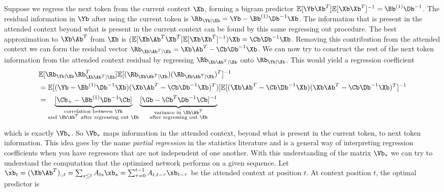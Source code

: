 \documentclass{article}
\begin{document}
Suppose we regress the next token from the current context $\Xb$, forming a bigram predictor $\mathbb{E}[\Yb\Xb^T]\mathbb{E}[\Xb\Xb^T]^{-1} = \Bb^{(1)}\Db^{-1}$. The residual information in $\Yb$ after using the current token is $\Rb_{\Yb|\Xb} = \Yb - \Bb^{(1)}\Db^{-1}\Xb$. The information that is present in the attended context beyond what is present in the current context can be found by this same regressing out procedure. The best approximation to $\Xb \Ab^T$ from $\Xb$ is $(\mathbb{E}[\Xb\Ab^T\Xb^T]\mathbb{E}[\Xb\Xb^T]^{-1})\Xb = \Cb \Db^{-1}\Xb$. Removing this contribution from the attended context we can form the residual vector $\Rb_{\Xb \Ab^T | \Xb} = \Xb\Ab^T - \Cb\Db^{-1}\Xb$. We can now try to construct the rest of the next token information from the attended context residual by regressing $\Rb_{\Xb \Ab^T | \Xb}$ onto $\Rb_{\Yb|\Xb}$. This would yield a regression coefficient 
\begin{align}
    &\mathbb{E}[\Rb_{\Yb|\Xb}\Rb_{\Xb \Ab^T | \Xb}^T]\mathbb{E}[(\Rb_{\Xb \Ab^T | \Xb})(\Rb_{\Xb \Ab^T | \Xb})^T]^{-1}\\
    &= \mathbb{E}[(\Yb - \Bb^{(1)}\Db^{-1}\Xb)(\Xb\Ab^T - \Cb\Db^{-1}\Xb)^T)]\mathbb{E}[(\Xb\Ab^T - \Cb\Db^{-1}\Xb)(\Xb\Ab^T - \Cb\Db^{-1}\Xb)^T]^{-1} \\
    &= \underbrace{[\Cb_+ - \Bb^{(1)}\Db^{-1}\Cb]}_{\substack{\textrm{correlation between $\Yb$} \\ \textrm{and $\Xb\Ab^T$ after regressing out $\Xb$}}}\underbrace{[\Gb - \Cb^T \Db^{-1}\Cb]^{-1}}_{\substack{\textrm{variance in $\Xb\Ab^T$} \\ \textrm{after regressing out $\Xb$}}}
\end{align}

which is exactly $\Vb_*$. So $\Vb_*$ maps information in the attended context, beyond what is present in the current token, to next token information. This idea goes by the name \textit{partial regression} in the statistics literature and is a general way of interpreting regression coefficients when you have regressors that are not independent of one another. 
\newline
\newline
{}
\newline
With this understanding of the matrix $\Vb_*$ we can try to understand the computation that the optimized network performs on a given sequence. Let $\bar{\xb}_t = (\Xb \Ab^T)_{:,t} = \sum_{s\le t} A_{ts}\xb_s = \sum_{\tau=0}^{t-1} A_{t, t-\tau}\xb_{t-\tau}$ be the attended context at position $t$. At context position $t$, the optimal predictor is 
\end{document}
